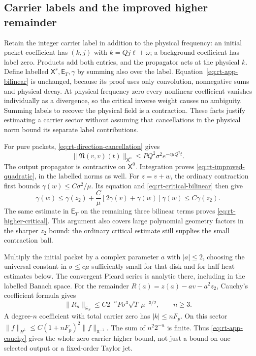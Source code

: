 \documentclass[11pt,a4paper]{amsart}
\theoremstyle{definition}
\theoremstyle{remark}
\numberwithin{equation}{section}
\newcommand{\norm}[1]{\lVert #1\rVert}
\begin{document}
\subsection{Carrier labels and the improved higher remainder}
Retain the integer carrier label in addition to the physical frequency:
an initial packet coefficient has $(k,j)$ with
$k=Qj\ell+\omega$; a background coefficient has label zero.  Products
add both entries, and the propagator acts at the physical $k$.
Define labelled $\mathsf X^r,\mathsf E_T,\gamma$ by summing also over
the label.  Equation~\eqref{eq:rt-app-bilinear} is unchanged, because
its proof uses only convolution, nonnegative sums and physical decay.
At physical frequency zero every nonlinear coefficient vanishes
individually as a divergence, so the critical inverse weight causes
no ambiguity.  Summing labels to recover the physical field is a
contraction.  These facts justify estimating a carrier sector without
assuming that cancellations in the physical norm bound its separate
label contributions.

For pure packets, \eqref{eq:rt-direction-cancellation} gives
\[
 \norm{\mathfrak N(v,v)(t)}_{\mathsf X^0}
       \le P Q^2\sigma^2e^{-c\mu Q^2t}.
\]
The output propagator is contractive on $\mathsf X^0$.  Integration
proves \eqref{eq:rt-improved-quadratic}, in the labelled norms as well.
For $z=v+w$, the ordinary contraction first bounds
$\gamma(w)\le C\sigma^2/\mu$.  Its equation and
\eqref{eq:rt-critical-bilinear} then give
\[
 \gamma(w)\le\gamma(z_2)+
 \frac C\mu[2\gamma(v)+\gamma(w)]\gamma(w)
 \le C\gamma(z_2).
\]
The same estimate in $\mathsf E_T$ on the remaining three bilinear
terms proves \eqref{eq:rt-higher-critical}.  This argument also covers
large polynomial geometry factors in the sharper $z_2$ bound: the
ordinary critical estimate still supplies the small contraction ball.

Multiply the initial packet by a complex parameter $a$ with $|a|\le2$,
choosing the universal constant in $\sigma\le c\mu$ sufficiently small
for that disk and for half-heat estimates below.  The convergent Picard
series is analytic there, including in the labelled Banach space.
For the remainder $R(a)=z(a)-av-a^2z_2$, Cauchy's coefficient formula
gives
\begin{equation}\label{eq:rt-app-cauchy}
 \norm{R_n}_{\mathsf E_T}
 \le C2^{-n}P\sigma^3\sqrt T\,\mu^{-3/2},\qquad n\ge3.
\end{equation}
A degree-$n$ coefficient with total carrier zero has
$|k|\le nF_p$.  On this sector
$\norm f_{H^1}\le C(1+nF_p)^2\norm f_{\mathsf X^{-1}}$.
The sum of $n^2 2^{-n}$ is finite.  Thus
\eqref{eq:rt-app-cauchy} gives the whole zero-carrier higher bound,
not just a bound on one selected output or a fixed-order Taylor jet.
\end{document}
